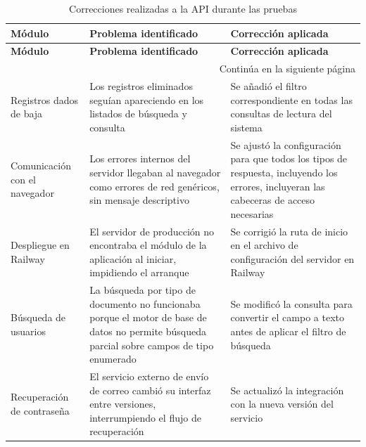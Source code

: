\begin{longtable}{|p{3.0cm}|p{4.2cm}|p{7.3cm}|}

\caption{Correcciones realizadas a la API durante las pruebas} \label{tab:cap4-api-correcciones} \\

\hline
\rowcolor{gray!20}
\textbf{Módulo} & \textbf{Problema identificado} & \textbf{Corrección aplicada} \\
\hline
\endfirsthead

\hline
\rowcolor{gray!20}
\textbf{Módulo} & \textbf{Problema identificado} & \textbf{Corrección aplicada} \\
\hline
\endhead

\hline
\multicolumn{3}{|r|}{\small Continúa en la siguiente página} \\
\hline
\endfoot

\hline
\endlastfoot

Registros dados de baja &
Los registros eliminados seguían apareciendo en los listados de búsqueda y consulta &
Se añadió el filtro correspondiente en todas las consultas de lectura del sistema \\
\hline

Comunicación con el navegador &
Los errores internos del servidor llegaban al navegador como errores de red genéricos, sin mensaje descriptivo &
Se ajustó la configuración para que todos los tipos de respuesta, incluyendo los errores, incluyeran las cabeceras de acceso necesarias \\
\hline

Despliegue en Railway &
El servidor de producción no encontraba el módulo de la aplicación al iniciar, impidiendo el arranque &
Se corrigió la ruta de inicio en el archivo de configuración del servidor en Railway \\
\hline

Búsqueda de usuarios &
La búsqueda por tipo de documento no funcionaba porque el motor de base de datos no permite búsqueda parcial sobre campos de tipo enumerado &
Se modificó la consulta para convertir el campo a texto antes de aplicar el filtro de búsqueda \\
\hline

Recuperación de contraseña &
El servicio externo de envío de correo cambió su interfaz entre versiones, interrumpiendo el flujo de recuperación &
Se actualizó la integración con la nueva versión del servicio \\

\end{longtable}

